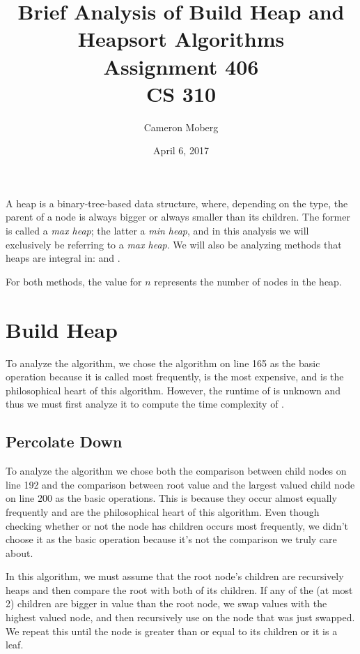 \documentclass[11pt]{article}
\begin{document}
\thispagestyle{empty}
\title{Brief Analysis of Build Heap and Heapsort Algorithms \\
\large Assignment 406 \\
CS 310}
\date{April 6, 2017}
\author{Cameron Moberg}
\maketitle

A heap is a binary-tree-based data structure, where, depending on the type, the parent of a node is always bigger or always smaller than its children.
The former is called a \textit{max heap}; the latter a \textit{min heap}, and in this analysis we will exclusively be referring to a \textit{max heap}. We will also be analyzing methods that heaps are integral in:  and .

For both methods, the value for $n$ represents the number of nodes in the heap.

\section{Build Heap}
To analyze the  algorithm, we chose the  algorithm on line 165 as the basic operation because it is called most frequently, is the most expensive, and is the philosophical heart of this algorithm. However, the runtime of   is unknown and thus we must first analyze it to compute the time complexity of  .
\subsection{Percolate Down}

To analyze the  algorithm we chose both the comparison between child nodes on line 192 and the comparison between root value and the largest valued child node on line 200 as the basic operations. This is because they occur almost equally frequently and are the philosophical heart of this algorithm. Even though checking whether or not the node has children occurs most frequently, we didn't choose it as the basic operation because it's not the comparison we truly care about.

In this algorithm, we must assume that the root node's children are recursively heaps and then compare the root with both of its children. If any of the (at most 2) children are bigger in value than the root node, we swap values with the highest valued node, and then recursively use  on the node that was just swapped. We repeat this until the node is greater than or equal to its children or it is a leaf.
\clearpage
\end{document}
